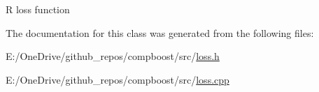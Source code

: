 {\ttfamily R} loss function 



The documentation for this class was generated from the following files\+:\begin{DoxyCompactItemize}
\item 
E\+:/\+One\+Drive/github\+\_\+repos/compboost/src/\mbox{\hyperlink{loss_8h}{loss.\+h}}\item 
E\+:/\+One\+Drive/github\+\_\+repos/compboost/src/\mbox{\hyperlink{loss_8cpp}{loss.\+cpp}}\end{DoxyCompactItemize}
